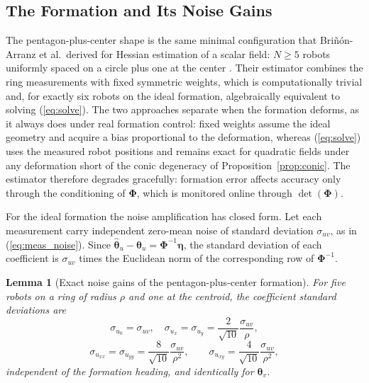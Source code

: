 \documentclass[lettersize,journal]{IEEEtran}
\newtheorem{lemma}{Lemma}
\begin{document}
\subsection{The Formation and Its Noise Gains}
\label{sec:formation}

The pentagon-plus-center shape is the same minimal configuration that
Bri\~{n}\'{o}n-Arranz et al.\ derived for Hessian estimation of a scalar
field: $N \geq 5$ robots uniformly spaced on a circle plus one at the
center \cite{15}. Their estimator combines the ring measurements with fixed
symmetric weights, which is computationally trivial and, for exactly six
robots on the ideal formation, algebraically equivalent to solving
(\ref{eq:solve}). The two approaches separate when the formation deforms,
as it always does under real formation control: fixed weights assume the
ideal geometry and acquire a bias proportional to the deformation,
whereas (\ref{eq:solve}) uses the measured robot positions and remains
exact for quadratic fields under any deformation short of the conic
degeneracy of Proposition~\ref{prop:conic}. The estimator therefore
degrades gracefully: formation error affects accuracy only through the
conditioning of $\boldsymbol{\Phi}$, which is monitored online through
$\det(\boldsymbol{\Phi})$.

For the ideal formation the noise amplification has closed form. Let each
measurement carry independent zero-mean noise of standard deviation
$\sigma_{uv}$, as in (\ref{eq:meas_noise}). Since
$\hat{\boldsymbol{\theta}}_u - \boldsymbol{\theta}_u =
\boldsymbol{\Phi}^{-1}\boldsymbol{\eta}$, the standard deviation of each
coefficient is $\sigma_{uv}$ times the Euclidean norm of the
corresponding row of $\boldsymbol{\Phi}^{-1}$.

\begin{lemma}[Exact noise gains of the pentagon-plus-center formation]
\label{lem:gains}
For five robots on a ring of radius $\rho$ and one at the centroid, the
coefficient standard deviations are
\begin{equation}
    \sigma_{u_0} = \sigma_{uv}, \quad
    \sigma_{u_x} = \sigma_{u_y} = \frac{2}{\sqrt{10}}\frac{\sigma_{uv}}{\rho},
    \label{eq:gain_grad}
\end{equation}
\begin{equation}
    \sigma_{u_{xx}} = \sigma_{u_{yy}} = \frac{8}{\sqrt{10}}
    \frac{\sigma_{uv}}{\rho^2},
    \qquad
    \sigma_{u_{xy}} = \frac{4}{\sqrt{10}}\frac{\sigma_{uv}}{\rho^2},
    \label{eq:gain_hess}
\end{equation}
independent of the formation heading, and identically for
$\boldsymbol{\theta}_v$.
\end{lemma}
\end{document}
